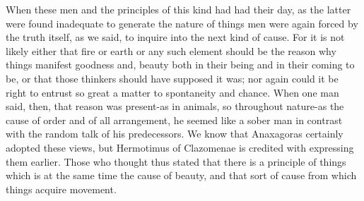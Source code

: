 \documentclass{article}
\begin{document}
When these men and the principles of this kind had had their day, as the latter were found inadequate to generate the nature of things men were again forced by the truth itself, as we said, to inquire into the next kind of cause. For it is not likely either that fire or earth or any such element should be the reason why things manifest goodness and, beauty both in their being and in their coming to be, or that those thinkers should have supposed it was; nor again could it be right to entrust so great a matter to spontaneity and chance. When one man said, then, that reason was present-as in animals, so throughout nature-as the cause of order and of all arrangement, he seemed like a sober man in contrast with the random talk of his predecessors. We know that Anaxagoras certainly adopted these views, but Hermotimus of Clazomenae is credited with expressing them earlier. Those who thought thus stated that there is a principle of things which is at the same time the cause of beauty, and that sort of cause from which things acquire movement.
\end{document}

